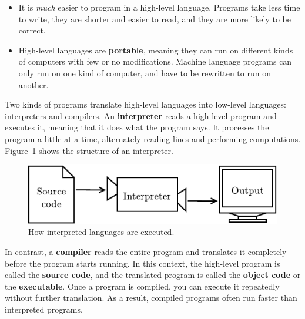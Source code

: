\begin{itemize}

\item It is {\em much} easier to program in a high-level language.
Programs take less time to write, they are shorter and easier to read, and they are more likely to be correct.


\item High-level languages are {\bf portable}, meaning they can run on different kinds of computers with few or no modifications.
Machine language programs can only run on one kind of computer, and have to be rewritten to run on another.

\end{itemize}


Two kinds of programs translate high-level languages into low-level languages: interpreters and compilers.
An {\bf interpreter} reads a high-level program and executes it, meaning that it does what the program says.
It processes the program a little at a time, alternately reading lines and performing computations.
Figure~\ref{fig.interpreter} shows the structure of an interpreter.

\begin{figure}[!ht]
\begin{center}
\includegraphics{figs/interpreter.pdf}
\caption{How interpreted languages are executed.}
\label{fig.interpreter}
\end{center}
\end{figure}


In contrast, a {\bf compiler} reads the entire program and translates it completely before the program starts running.
In this context, the high-level program is called the {\bf source code}, and the translated program is called the {\bf object code} or the {\bf executable}.
Once a program is compiled, you can execute it repeatedly without further translation.
As a result, compiled programs often run faster than interpreted programs.

